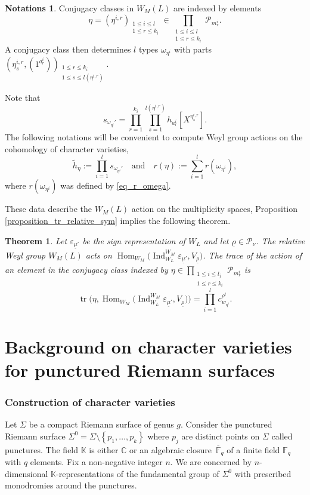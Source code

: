 \documentclass[JEP,XML,SOM,NoEqCountersInSection,Unicode,published]{cedram}
\newcommand{\quand}{\quad\text{and}\quad}
\let\epsilon\varepsilon
\theoremstyle{definition}
\newtheorem{notations}[definition]{Notations}
\theoremstyle{plain}
\newtheorem{theorem}[definition]{Theorem}
\DeclareMathOperator{\Hom}{Hom}
\DeclareMathOperator{\Ind}{Ind}
\DeclareMathOperator{\tr}{tr}
\newcommand{\C}{\mathbb{C}}
\newcommand{\Fq}{\mathbb{F}_q}
\newcommand{\Fqbar}{\overline{\mathbb{F}}_q}
\newcommand{\Part}{\mathcal{P}}
\begin{document}
\begin{notations}\label{notations_h_tilde}
Conjugacy classes in $W_M(L)$ are indexed by elements
\[
\eta=(\eta^{i,r})_{\substack{ 1 \le i \le l\\ 1 \le r \le k_{i}}} \in \prod_{\substack{ 1 \le i \le l \\ 1 \le r \le k_{i}}} \Part_{m^{i}_{r}}.
\]
A conjugacy class then determines $l$ types
$\omega_{\eta^i}$ with parts $(\eta^{i,r}_s,(1^{a^i_r}))_{\substack{ 1\le r \le k_i \\ 1\le s \le l(\eta^{i,r})}} $.

Note that
\[
s_{\omega_{\eta^i}'}= \prod_{r=1}^{k_i} \prod_{s=1}^{l(\eta^{i,r})} h_{a^i_r}[X^{\eta^{i,r}_s}].
\]
The following notations will be convenient to compute Weyl group actions on the cohomology of character varieties,
\[
\widetilde{h}_{\eta}:=\prod_{i=1}^l s_{\omega_{\eta^i}'}
\quand
r(\eta):=\sum_{i=1}^l r(\omega_{\eta^i}),
\]
where $r(\omega_{\eta^i})$ was defined by \eqref{eq_r_omega}.
\end{notations}

These data describe the $W_M(L)$ action on the multiplicity spaces, Proposition \ref{proposition_tr_relative_sym} implies the following theorem.
\begin{theorem}
Let $\epsilon_{\underline{\mu}'}$ be the sign representation of $W_L$ and let $\underline{\rho}\in\Part_{\nu}$. The relative Weyl group $W_M (L)$ acts on $\Hom_{W_M} \bigl(\Ind_{W_L}^{W_M} \epsilon_{\underline{\mu}'}, V_{\underline{\rho}}\bigr)$. The trace of the action of an element in the conjugacy class indexed by $\eta \in \prod_{\substack{ 1 \le i \le l_j \\ 1 \le r \le k_{i}}} \Part_{m^{i}_{r}}$ is
\[
\tr\bigl(\eta, \Hom_{W_M} \bigl(\Ind_{W_L}^{W_M} \epsilon_{\underline{\mu}'}, V_{\underline{\rho}}\bigr)\bigr) = \prod_{i=1}^{l} c^{\rho^i}_{w_{\eta^i}}.
\]
\end{theorem}

\section{Background on character varieties for punctured Riemann surfaces}\label{sect_background_char}

\subsubsection{Construction of character varieties}
Let $\Sigma$ be a compact Riemann surface of genus $g$. Consider the punctured Riemann surface $\Sigma^0=\Sigma\setminus\left\lbrace p_1,\dots,p_k\right\rbrace$ where $p_j$ are distinct points on $\Sigma$ called punctures. The field $\mathbb{K}$ is either $\C$ or an algebraic closure~$\Fqbar$ of a finite field $\Fq$ with $q$ elements. Fix a non-negative integer $n$. We are concerned by $n$-dimensional $\mathbb{K}$-representations of the fundamental group of $\Sigma^0$ with prescribed monodromies around the punctures.
\end{document}
